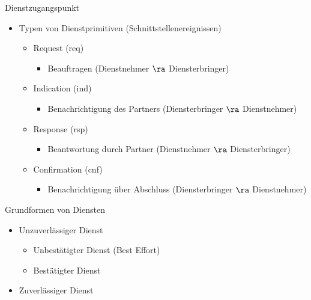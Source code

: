     Dienstzugangspunkt
    \begin{itemize}
      \item Typen von Dienstprimitiven (Schnittstellenereignissen)
        \begin{itemize}
          \item Request (req)
            \begin{itemize}
              \item Beauftragen (Dienstnehmer $\ra$ Diensterbringer)
            \end{itemize}
          \item Indication (ind)
            \begin{itemize}
              \item Benachrichtigung des Partners (Diensterbringer $\ra$ Dienstnehmer)
            \end{itemize}
          \item Response (rsp)
            \begin{itemize}
              \item Beantwortung durch Partner (Dienstnehmer $\ra$ Diensterbringer)
            \end{itemize}
          \item Confirmation (cnf)
            \begin{itemize}
              \item Benachrichtigung über Abschluss (Diensterbringer $\ra$ Dienstnehmer)
            \end{itemize}
        \end{itemize}
    \end{itemize}
    Grundformen von Diensten
    \begin{itemize}
      \item Unzuverlässiger Dienst
        \begin{itemize}
          \item Unbestätigter Dienst (Best Effort)
          \item Bestätigter Dienst
        \end{itemize}
      \item Zuverlässiger Dienst
    \end{itemize}
